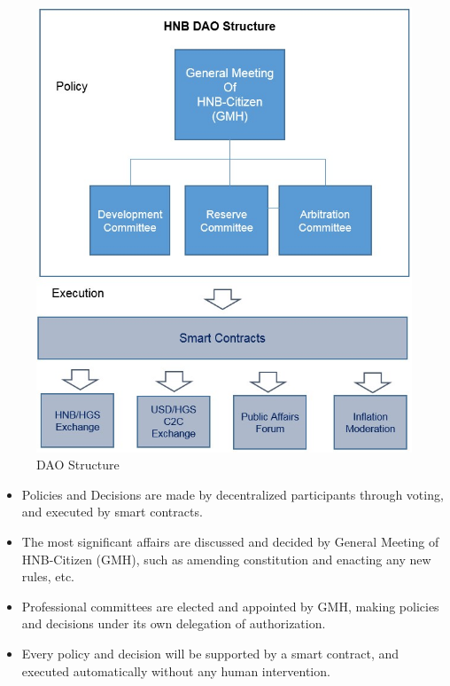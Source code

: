 \documentclass[fleqn,10pt]{SelfArx} %
\begin{document}
\begin{figure}[ht]\centering
\includegraphics[width=\linewidth]{11}
\caption{DAO Structure}
\label{fig:11}
\end{figure}

\begin{itemize}
\item{Policies and Decisions are made by decentralized participants through voting, and executed by smart contracts.}
\item{The most significant affairs are discussed and decided by General Meeting of HNB-Citizen (GMH), such as amending constitution and enacting any new rules, etc. }
\item{Professional committees are elected and appointed by GMH, making policies and decisions under its own delegation of authorization.}
\item{Every policy and decision will be supported by a smart contract, and executed automatically without any human intervention.}
\end{itemize}
\end{document}
